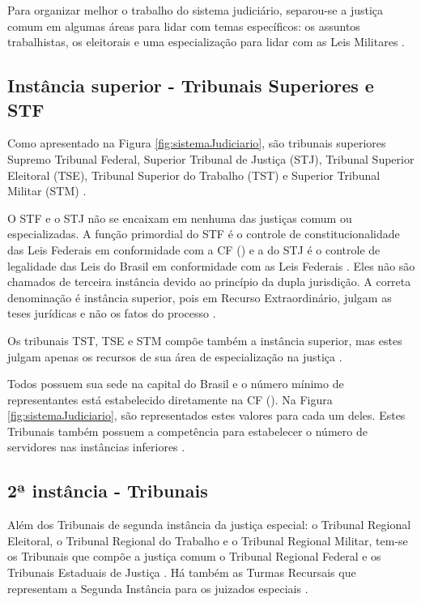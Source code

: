 Para organizar melhor o trabalho do sistema judiciário, separou-se a justiça comum em algumas áreas para lidar com temas específicos: os assuntos trabalhistas, os eleitorais e uma especialização para lidar com as Leis Militares \cite{amendoeira_jr_manual_2012}. 

\subsection{Instância superior - Tribunais Superiores e STF}

Como apresentado na Figura \ref{fig:sistemaJudiciario}, são tribunais superiores Supremo Tribunal Federal, Superior Tribunal de Justiça (STJ), Tribunal Superior Eleitoral (TSE), Tribunal Superior do Trabalho (TST) e Superior Tribunal Militar (STM) \cite{brasil_constituicao_1988}.

O STF e o STJ não se encaixam em nenhuma das justiças comum ou especializadas. A função primordial do STF é o controle de constitucionalidade das Leis Federais em conformidade com a CF (\citeyear{brasil_constituicao_1988}) e a do STJ é o controle de legalidade das Leis do Brasil em conformidade com as Leis Federais \cite{brasil_constituicao_1988}.
Eles não são chamados de terceira instância devido ao princípio da dupla jurisdição. A correta denominação é instância superior, pois em Recurso Extraordinário, julgam as teses jurídicas e não os fatos do processo \cite{amendoeira_jr_manual_2012}.

Os tribunais TST, TSE e STM compõe também a instância superior, mas estes julgam apenas os recursos de sua área de especialização na justiça \cite{brasil_constituicao_1988}.

Todos possuem sua sede na capital do Brasil e o número mínimo de representantes está estabelecido diretamente na CF (\citeyear{brasil_constituicao_1988}). Na Figura \ref{fig:sistemaJudiciario}, são representados estes valores para cada um deles. Estes Tribunais também possuem a competência para estabelecer o número de servidores nas instâncias inferiores \cite{brasil_constituicao_1988}.

\subsection{2ª instância - Tribunais}

Além dos Tribunais de segunda instância da justiça especial: o Tribunal Regional Eleitoral, o Tribunal Regional do Trabalho e o Tribunal Regional Militar, tem-se os Tribunais que compõe a justiça comum o Tribunal Regional Federal e os Tribunais Estaduais de Justiça \cite{brasil_constituicao_1988}. Há também as Turmas Recursais que representam a Segunda Instância para os juizados especiais \cite{noauthor_lei_2012}.

